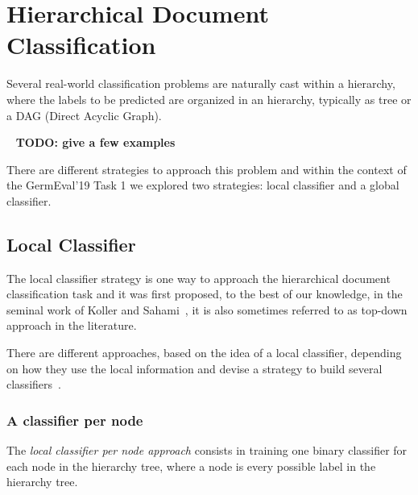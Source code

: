 \documentclass[11pt,a4paper]{article}
\begin{document}













\section{Hierarchical Document Classification}\label{hierarchical-clf}


Several real-world classification problems are naturally cast within a hierarchy,
where the labels to be predicted are organized in an hierarchy, typically as
tree or a DAG (Direct Acyclic Graph).

\ \newline
\textbf{TODO: give a few examples}
\ \newline

There are different strategies to approach this problem and within the context
of the GermEval'19 Task 1 we explored two strategies: local classifier and a
global classifier.


\subsection{Local Classifier}

The local classifier strategy is one way to approach the hierarchical document classification task
and it was first proposed, to the best of our knowledge, in the seminal work of Koller and
Sahami~, it is also sometimes referred to as top-down
approach in the literature.

There are different approaches, based on the idea of a local classifier, depending on how they use
the local information and devise a strategy to build several classifiers~\cite{Silla:2011:SHC:1937796.1937884}.


\subsubsection{A classifier per node} %
The \textit{local classifier per node approach} consists in training one binary classifier for each
node in the hierarchy tree, where a node is every possible label in the hierarchy tree.
\end{document}
